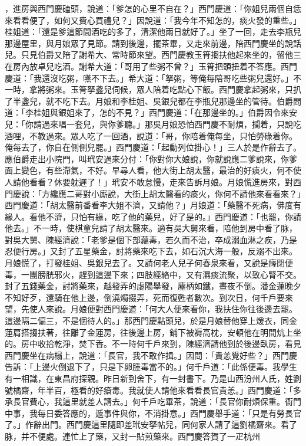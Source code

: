 ，進房與西門慶磕頭，說道：「爹怎的心里不自在？」西門慶道：「你姐兒兩個自恁來看看便了，如何又費心買禮兒？」因說道：「我今年不知怎的，痰火發的重些。」桂姐道：「還是爹這節間酒吃的多了，清潔他兩日就好了。」坐了一回，走去李瓶兒那邊屋里，與月娘眾了見節。請到後邊，擺茶畢，又走來前邊，陪西門慶坐的說話兒。只見伯爵又陪了謝希大、常時節來望。西門慶教玉筲搊扶他起來坐的，留他三在房內放卓兒吃酒。謝希大道：「哥用了些粥不曾？」玉筲把頭扭着不答應。西門慶道：「我還沒吃粥，嚥不下去。」希大道：「拏粥，等俺每陪哥吃些粥兒還好。」不一時，拿將粥來。玉筲拏盞兒伺候，眾人陪着吃點心下飯。西門慶拿起粥來，只扒了半盞兒，就不吃下去。月娘和李桂姐、吳銀兒都在李瓶兒那邊坐的管待。伯爵問道：「李桂姐與銀姐來了，怎的不見？」西門慶道：「在那邊坐的。」伯爵因令來安兒：「你請過來唱一套兒，與你爹聽。」那吳月娘恐怕西門慶不耐煩，攔着，只說吃酒哩，不教過來。眾人吃了一回酒，說道：「哥，你陪着俺每坐，只怕勞碌着你。俺每去了，你自在側側兒罷。」西門慶道：「起動列位掛心！」三人於是作辭去了。應伯爵走出小院門，叫玳安過來分付：「你對你大娘說，你就說應二爹說來，你爹面上變色，有些滯氣，不好。早尋人看，他大街上胡太醫，最治的好痰火，何不使人請他看看？休要躭遲了！」玳安不敢怠慢，走來告訴月娘。月娘慌進房來，對西門慶說：「方纔應二哥對小廝說，大街上胡太醫看的痰火，你何不請他來看看來？」西門慶道：「胡太醫前番看李大姐不濟，又請他？」月娘道：「藥醫不死病，佛度有緣人。看他不濟，只怕有緣，吃了他的藥兒，好了是的。」西門慶道：「也罷，你請他去。」不一時，使棋童兒請了胡太醫來。適有吳大舅來看，陪他到房中看了脉，對吳大舅、陳經濟說：「老爹是個下部蘊毒，若久而不治，卒成溺血淋之疾，乃是忍便行房。」又封了五星藥金，討將藥來吃下去，如石沉大海一般，反溺不出來。月娘慌了，打發桂姐、吳銀兒去了。又請何老人兒子何春泉來看，又說是癃閉便毒，一團膀胱邪火，趕到這邊下來；四肢經絡中，又有濕痰流聚，以致心腎不交。封了五錢藥金，討將藥來，越發弄的虛陽舉發，塵柄如鐵，晝夜不倒。潘金蓮晚夕不知好歹，還騎在他上邊，倒澆燭掇弄，死而復甦者數次。到次日，何千戶要來望，先使人來說。月娘便對西門慶道：「何大人便來看你，我扶住你往後邊去罷。這邊隔二偏三，不是個待人的。」那西門慶點頭兒，於是月娘替他穿上煖衣，同金蓮肩搭搊扶著，往離了金蓮房，往後邊上房，鋪下被褥高枕，安頓他在明間炕上坐的。房中收拾乾淨，焚下香。不一時何千戶來到，陳經濟請他到於後邊臥房，看見西門慶坐在病榻上，說道：「長官，我不敢作揖。」因問：「貴恙覺好些？」西門慶告訴：「上邊火倒退下了，只是下卵腫毒當不的。」何千戶道：「此係便毒。我學生有一相識，在東昌府探親。昨日新到舍下，有一封書下。乃是山西汾州人氏，姓劉號橘齋，年半百，極看的好瘡毒。我就使人請他來看看長官貴恙。」西門慶道：「多承長官費心，我這里就差人請去。」何千戶吃畢茶，說道：「長官你耐煩保重。衙門中事，我每日委答應的，遞事件與你，不消掛意。」西門慶舉手道：「只是有勞長官了。」作辭出門。西門慶這里隨即差玳安拏帖兒，同何家人請了這劉橘齋來。看了脉，并不便處。連忙上了藥，又封一貼煎藥來。西門慶答賀了一疋杭州